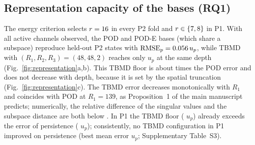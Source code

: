 

\subsection{Representation capacity of the bases (RQ1)}
\label{sec:res_representation}
The energy criterion selects $r=16$ in every P2 fold and $r\in\{7,8\}$ in P1. With all active channels observed, the POD and POD-E bases (which share a subspace) reproduce held-out P2 states with $\mathrm{RMSE}_p=0.056\,u_p$, while TBMD with $(R_1,R_2,R_3)=(48,48,2)$ reaches only \EOnePTwoTbmdOracle{} $u_p$ at the same depth (Fig.~\ref{fig:representation}a,b). This TBMD floor is about \EOnePTwoFloorRatio{} times the POD error and does not decrease with depth, because it is set by the spatial truncation (Fig.~\ref{fig:representation}c). The TBMD error decreases monotonically with $R_1$ and coincides with POD at $R_1=139$, as Proposition~1 of the main manuscript predicts; numerically, the relative difference of the singular values and the subspace distance are both below \PropSvDiff{}. In P1 the TBMD floor (\EOnePOneTbmdOracle{} $u_p$) already exceeds the error of persistence (\POnePriorGridTenP{} $u_p$); consistently, no TBMD configuration in P1 improved on persistence (best mean error \POneTbmdBest{} $u_p$; Supplementary Table~S3).



